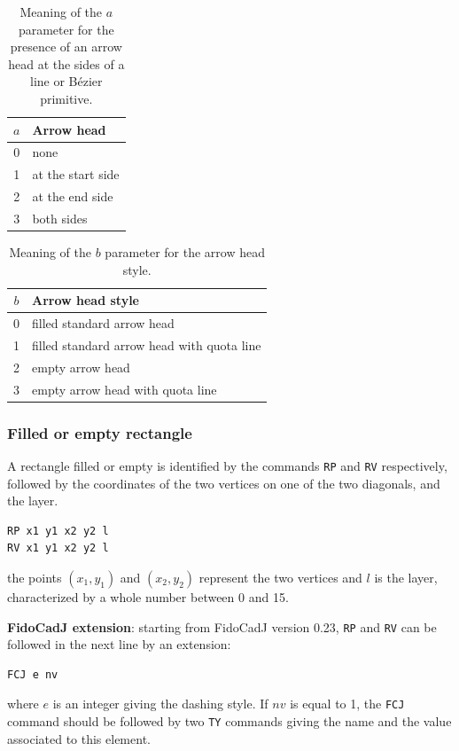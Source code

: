 \documentclass[10pt,a4paper,twoside]{scrreprt}
\newcommand{\toprule}{\hline}
\newcommand{\midrule}{\hline}
\newcommand{\bottomrule}{\hline}
\begin{document}
\begin{table}
\centering

\begin{tabular}{cp{}}
\toprule
$a$ & Arrow head \\
\midrule
0   & none \\
1   & at the start side\\
2   & at the end side\\
3   & both sides\\
\bottomrule
\end{tabular}
\caption{Meaning of the $a$ parameter for the presence of an arrow head at the sides of a line or B\'ezier primitive.}
\label{tab_frecce_estremita}
\end{table}

\begin{table}
\centering
\begin{tabular}{cp{}}
\toprule
$b$ & Arrow head style \\
\midrule
0   & filled standard arrow head \\
1   & filled standard arrow head with quota line \\
2   & empty arrow head\\
3   & empty arrow head with quota line\\
\bottomrule
\end{tabular}
\caption{Meaning of the $b$ parameter for the arrow head style.}
\label{tab_frecce_stile}
\end{table}

\subsubsection{Filled or empty rectangle}

A rectangle filled or empty is identified by the
commands \lstinline!RP! and \lstinline!RV!
respectively, followed by the coordinates of the two vertices on one
of the two diagonals, and the layer.
\begin{lstlisting}
RP x1 y1 x2 y2 l
RV x1 y1 x2 y2 l
\end{lstlisting} the points $(x_{1},y_{1})$
and $(x_{2},y_{2})$ represent the two vertices and $l$ is the layer,
characterized by a whole number between 0 and 15.

\textbf{FidoCadJ extension}: starting from FidoCadJ version 0.23,  \lstinline!RP! and \lstinline!RV! can be followed in the next line by an extension:
\begin{lstlisting}
FCJ e nv
\end{lstlisting}
where $e$ is an integer giving the dashing style. If $nv$ is equal to 1, the \lstinline!FCJ! command should be followed by two \lstinline!TY! commands giving the name and the value associated to this element.
\end{document}
